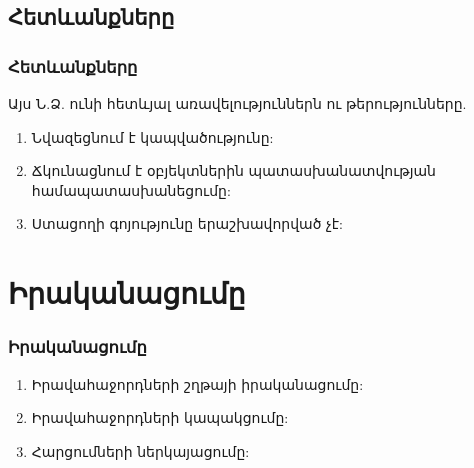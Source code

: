 \documentclass{beamer}
\begin{document}
\subsection{Հետևանքները}
\begin{frame}\frametitle{Հետևանքները}
Այս Ն.Ձ. ունի հետևյալ առավելություններն ու թերությունները.
\vfill
\begin{enumerate}
    \item Նվազեցնում է կապվածությունը: \pause \vfill
    \item Ճկունացնում է օբյեկտներին պատասխանատվության համապատասխանեցումը: \pause \vfill
    \item Ստացողի գոյությունը երաշխավորված չէ:
\end{enumerate}
\end{frame}

\section{Իրականացումը}
\begin{frame}\frametitle{Իրականացումը}
\begin{enumerate}
    \item Իրավահաջորդների շղթայի իրականացումը: \vfill
    \item Իրավահաջորդների կապակցումը: \vfill
    \item Հարցումների ներկայացումը:
\end{enumerate}
\end{frame}
\end{document}
